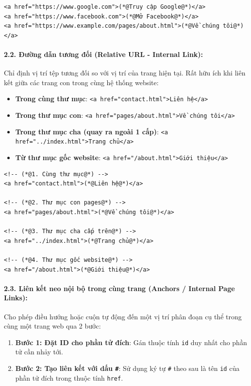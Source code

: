 \documentclass[11pt,oneside]{book}
\newcommand{\codeinline}[1]{\textcolor{accentOrange}{\texttt{#1}}}
\begin{document}
\begin{codeWindow}
\begin{lstlisting}[language=HTML5]
<a href="https://www.google.com">(*@Truy cập Google@*)</a>
<a href="https://www.facebook.com">(*@Mở Facebook@*)</a>
<a href="https://www.example.com/pages/about.html">(*@Về chúng tôi@*)</a>
\end{lstlisting}
\end{codeWindow}

\paragraph{2.2. Đường dẫn tương đối (Relative URL - Internal Link):}
Chỉ định vị trí tệp tương đối so với vị trí của trang hiện tại. Rất hữu ích khi liên kết giữa các trang con trong cùng hệ thống website:
\begin{itemize}[leftmargin=1.5em, itemsep=2pt, parsep=0pt]
    \item \textbf{Trong cùng thư mục}: \codeinline{<a href="contact.html">Liên hệ</a>}
    \item \textbf{Trong thư mục con}: \codeinline{<a href="pages/about.html">Về chúng tôi</a>}
    \item \textbf{Trong thư mục cha (quay ra ngoài 1 cấp)}: \codeinline{<a href="../index.html">Trang chủ</a>}
    \item \textbf{Từ thư mục gốc website}: \codeinline{<a href="/about.html">Giới thiệu</a>}
\end{itemize}

\begin{codeWindow}
\begin{lstlisting}[language=HTML5]
<!-- (*@1. Cùng thư mục@*) -->
<a href="contact.html">(*@Liên hệ@*)</a>

<!-- (*@2. Thư mục con pages@*) -->
<a href="pages/about.html">(*@Về chúng tôi@*)</a>

<!-- (*@3. Thư mục cha cấp trên@*) -->
<a href="../index.html">(*@Trang chủ@*)</a>

<!-- (*@4. Thư mục gốc website@*) -->
<a href="/about.html">(*@Giới thiệu@*)</a>
\end{lstlisting}
\end{codeWindow}

\paragraph{2.3. Liên kết neo nội bộ trong cùng trang (Anchors / Internal Page Links):}
Cho phép điều hướng hoặc cuộn tự động đến một vị trí phân đoạn cụ thể trong cùng một trang web qua 2 bước:
\begin{enumerate}[leftmargin=1.5em, itemsep=2pt, parsep=0pt]
    \item \textbf{Bước 1: Đặt ID cho phần tử đích}: Gán thuộc tính \codeinline{id} duy nhất cho phần tử cần nhảy tới.
    \item \textbf{Bước 2: Tạo liên kết với dấu \codeinline{\#}}: Sử dụng ký tự \codeinline{\#} theo sau là tên \codeinline{id} của phần tử đích trong thuộc tính \codeinline{href}.
\end{enumerate}
\end{document}
